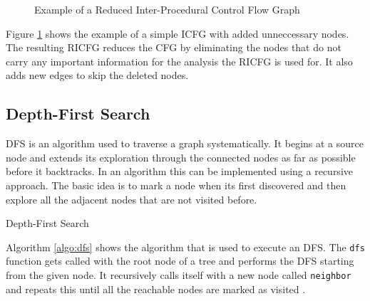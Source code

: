 \documentclass[
fancyheadings, %
%
%
]{stsreprt}
\begin{document}
{\begin{figure}[H]
			\caption{Example of a Reduced Inter-Procedural Control Flow Graph}
			\label{ricfg}
		\end{figure}
		
		Figure \ref{ricfg} shows the example of a simple \ac{ICFG} with added unneccessary nodes. The resulting \ac{RICFG} reduces the \ac{CFG} by eliminating the nodes that do not carry any important information for the analysis the \ac{RICFG} is used for. It also adds new edges to skip the deleted nodes.
		 
		\subsection{Depth-First Search}
		\ac{DFS} is an algorithm used to traverse a graph systematically. It begins at a source node and extends its exploration through the connected nodes as far as possible before it backtracks. In an algorithm this can be implemented using a recursive approach. The basic idea is to mark a node when its first discovered and then explore all the adjacent nodes that are not visited before. 
		
		\begin{algorithm}[H]
			\label{algo:dfs}
			\caption{Depth-First Search}
			\SetAlgoLined
			
		\end{algorithm}
		
		Algorithm \ref{algo:dfs} shows the algorithm that is used to execute an \ac{DFS}. The \texttt{dfs} function gets called with the root node of a tree and performs the \ac{DFS} starting from the given node. It recursively calls itself with a new node called \texttt{neighbor} and repeats this until all the reachable nodes are marked as visited \cite{mehl2008}.
		\begin{figure}[H]
			
		\centering
		\begin{tikzpicture}[
			every node/.style={circle, draw, minimum size=7mm},
			level/.style={sibling distance=20mm/#1}
			]
			

\end{tikzpicture}
\end{figure}}
\end{document}
